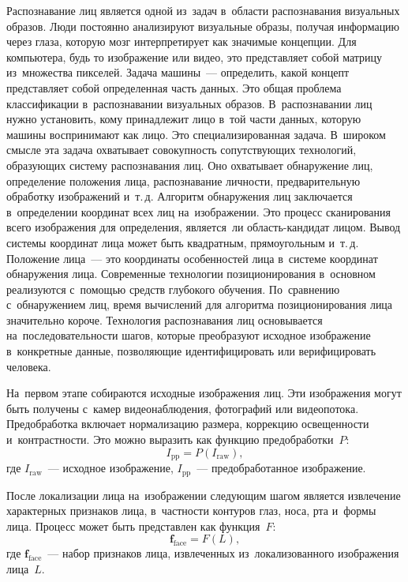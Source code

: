 Распознавание лиц является одной из~задач в~области распознавания
визуальных образов. Люди постоянно анализируют визуальные образы, получая
информацию через глаза, которую мозг интерпретирует как значимые концепции.
Для компьютера, будь то изображение или видео, это представляет собой
матрицу из~множества пикселей. Задача машины~--- определить, какой концепт
представляет собой определенная часть данных. Это общая проблема
классификации в~распознавании визуальных образов. В~распознавании лиц
нужно установить, кому принадлежит лицо в~той части данных, которую
машины воспринимают как лицо. Это специализированная задача. В~широком
смысле эта задача охватывает совокупность сопутствующих технологий,
образующих систему распознавания лиц. Оно охватывает обнаружение лиц, определение
положения лица, распознавание личности, предварительную обработку
изображений и~т.\,д. Алгоритм обнаружения лиц заключается в~определении
координат всех лиц на~изображении. Это процесс сканирования всего
изображения для определения, является~ли область-кандидат лицом.
Вывод системы координат лица может быть квадратным, прямоугольным
и~т.\,д. Положение лица~--- это координаты особенностей лица в~системе
координат обнаружения лица. Современные технологии позиционирования
в~основном реализуются с~помощью средств глубокого обучения.
По~сравнению с~обнаружением лиц, время вычислений для алгоритма
позиционирования лица значительно короче. Технология распознавания лиц
основывается на~последовательности шагов, которые преобразуют исходное
изображение в~конкретные данные, позволяющие идентифицировать или
верифицировать человека.

На~первом этапе собираются исходные изображения лиц. Эти изображения
могут быть получены с~камер видеонаблюдения, фотографий или видеопотока.
Предобработка включает нормализацию размера, коррекцию
освещенности и~контрастности. Это можно выразить как функцию
предобработки~$P$:
\begin{equation}\label{eq:ch1/preprocess}
    I_{\text{pp}}=P(I_{\text{raw}}),
\end{equation}
где $I_{\text{raw}}$~--- исходное изображение, $I_{\text{pp}}$~---
предобработанное изображение.

После локализации лица на~изображении следующим шагом является извлечение
характерных признаков лица, в~частности контуров глаз, носа, рта и~формы
лица. Процесс может быть представлен как функция~$F$:
\begin{equation}\label{eq:ch1/featext}
    \mathbf{f}_{\text{face}}=F(L),
\end{equation}
где $\mathbf{f}_{\text{face}}$~--- набор признаков лица, извлеченных
из~локализованного изображения лица~$L$.

